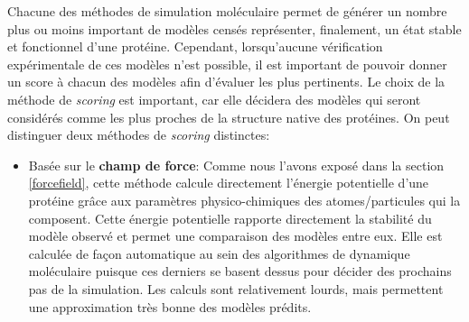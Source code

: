 Chacune des méthodes de simulation moléculaire permet de générer un nombre plus ou moins important de modèles censés représenter, finalement, un état stable et fonctionnel d'une protéine. Cependant, lorsqu'aucune vérification expérimentale de ces modèles n'est possible, il est important de pouvoir donner un score à chacun des modèles afin d'évaluer les plus pertinents. Le choix de la méthode de \textit{scoring} est important, car elle décidera des modèles qui seront considérés comme les plus proches de la structure native des protéines. On peut distinguer deux méthodes de \textit{scoring} distinctes:

\begin{itemize}
	\item Basée sur le \textbf{champ de force}: Comme nous l'avons exposé dans la section \ref{forcefield}, cette méthode calcule directement l'énergie potentielle d'une protéine grâce aux paramètres physico-chimiques des atomes/particules qui la composent. Cette énergie potentielle rapporte directement la stabilité du modèle observé et permet une comparaison des modèles entre eux. Elle est calculée de façon automatique au sein des algorithmes de dynamique moléculaire puisque ces derniers se basent dessus pour décider des prochains pas de la simulation. Les calculs sont relativement lourds, mais permettent une approximation très bonne des modèles prédits.

\end{itemize}
